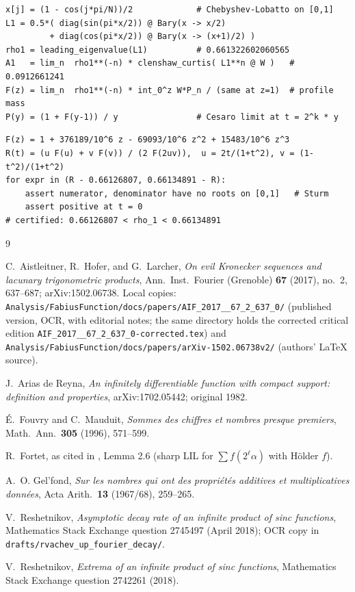 \documentclass[11pt,oneside]{article}
\theoremstyle{definition}
\theoremstyle{remark}
\begin{document}
\begin{lstlisting}[style=pseudo,caption={Transfer operator: Perron root,
shell constant, and mantissa profile}]
x[j] = (1 - cos(j*pi/N))/2             # Chebyshev-Lobatto on [0,1]
L1 = 0.5*( diag(sin(pi*x/2)) @ Bary(x -> x/2)
         + diag(cos(pi*x/2)) @ Bary(x -> (x+1)/2) )
rho1 = leading_eigenvalue(L1)          # 0.661322602060565
A1   = lim_n  rho1**(-n) * clenshaw_curtis( L1**n @ W )   # 0.0912661241
F(z) = lim_n  rho1**(-n) * int_0^z W*P_n / (same at z=1)  # profile mass
P(y) = (1 + F(y-1)) / y                # Cesaro limit at t = 2^k * y
\end{lstlisting}

\begin{lstlisting}[style=pseudo,caption={Document 4's certificate,
as executed (passes)}]
F(z) = 1 + 376189/10^6 z - 69093/10^6 z^2 + 15483/10^6 z^3
R(t) = (u F(u) + v F(v)) / (2 F(2uv)),  u = 2t/(1+t^2), v = (1-t^2)/(1+t^2)
for expr in (R - 0.66126807, 0.66134891 - R):
    assert numerator, denominator have no roots on [0,1]   # Sturm
    assert positive at t = 0
# certified: 0.66126807 < rho_1 < 0.66134891
\end{lstlisting}

\begin{thebibliography}{9}

C.~Aistleitner, R.~Hofer, and G.~Larcher,
\emph{On evil Kronecker sequences and lacunary trigonometric products},
Ann.\ Inst.\ Fourier (Grenoble) \textbf{67} (2017), no.~2, 637--687;
arXiv:1502.06738.
Local copies:
\nolinkurl{Analysis/FabiusFunction/docs/papers/AIF_2017__67_2_637_0/}
(published version, OCR, with editorial notes; the same directory holds
the corrected critical edition
\nolinkurl{AIF_2017__67_2_637_0-corrected.tex}) and
\nolinkurl{Analysis/FabiusFunction/docs/papers/arXiv-1502.06738v2/}
(authors' \LaTeX{} source).

J.~Arias de Reyna,
\emph{An infinitely differentiable function with compact support:
definition and properties}, arXiv:1702.05442; original 1982.

\'E.~Fouvry and C.~Mauduit,
\emph{Sommes des chiffres et nombres presque premiers},
Math.\ Ann.\ \textbf{305} (1996), 571--599.

R.~Fortet, as cited in \cite{ahl2017}, Lemma 2.6 (sharp LIL for
$\sum f(2^\ell\alpha)$ with H\"older $f$).

A.~O. Gel'fond,
\emph{Sur les nombres qui ont des propri\'et\'es additives et
multiplicatives donn\'ees},
Acta Arith.\ \textbf{13} (1967/68), 259--265.

V.~Reshetnikov,
\emph{Asymptotic decay rate of an infinite product of sinc functions},
Mathematics Stack Exchange question 2745497 (April 2018); OCR copy in
\nolinkurl{drafts/rvachev_up_fourier_decay/}.

V.~Reshetnikov,
\emph{Extrema of an infinite product of sinc functions},
Mathematics Stack Exchange question 2742261 (2018).

\end{thebibliography}
\end{document}
